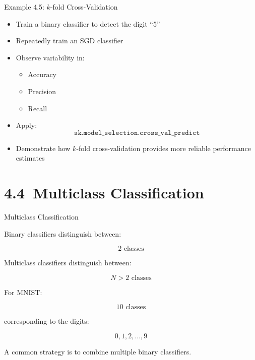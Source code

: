 \documentclass[aspectratio=169]{beamer}
\begin{document}

\begin{frame}{Example 4.5: $k$-fold Cross-Validation}
	
	\begin{itemize}
		\item Train a binary classifier to detect the digit ``5''
		\item Repeatedly train an SGD classifier
		\item Observe variability in:
		\begin{itemize}
			\item Accuracy
			\item Precision
			\item Recall
		\end{itemize}
		
		\vspace{0.5em}
		
		\item Apply:
		\[
		\texttt{sk.model\_selection.cross\_val\_predict}
		\]
		
		\vspace{0.5em}
		
		\item Demonstrate how $k$-fold cross-validation provides more reliable performance estimates
	\end{itemize}
	
\end{frame}

\section{4.4~Multiclass Classification}

\begin{frame}{Multiclass Classification}
	
	Binary classifiers distinguish between:
	
	\[
	2 \text{ classes}
	\]
	
	\vspace{0.5em}
	
	Multiclass classifiers distinguish between:
	
	\[
	N > 2 \text{ classes}
	\]
	
	\vspace{0.5em}
	
	For MNIST:
	
	\[
	10 \text{ classes}
	\]
	
	corresponding to the digits:
	
	\[
	0,1,2,\ldots,9
	\]
	
	\vspace{0.5em}
	
	A common strategy is to combine multiple binary classifiers.
	
\end{frame}
\end{document}
